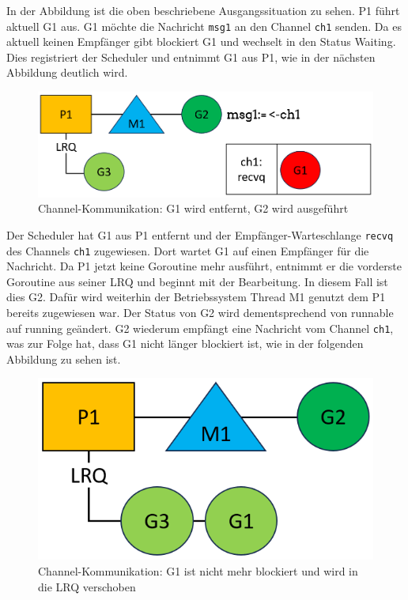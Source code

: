 \documentclass[fontsize=12pt,paper=a4,twoside=semi,parskip=half-,headsepline,headinclude]{scrreprt}
\begin{document}
In der Abbildung ist die oben beschriebene Ausgangssituation zu sehen. P1 führt aktuell G1 aus. G1 möchte die Nachricht \texttt{msg1} an den Channel \texttt{ch1} senden. Da es aktuell keinen Empfänger gibt blockiert G1 und wechselt in den Status Waiting. Dies registriert der Scheduler und entnimmt G1 aus P1, wie in der nächsten Abbildung deutlich wird.

\begin{figure}[h]
	\centering
	\includegraphics[scale=0.5]{figures/GoroutineChannel2.png}
	\caption{Channel-Kommunikation: G1 wird entfernt, G2 wird ausgeführt}
	\label{fig:GoroutineChannel2}
\end{figure}

Der Scheduler hat G1 aus P1 entfernt und der Empfänger-Warteschlange \texttt{recvq} des Channels \texttt{ch1} zugewiesen. Dort wartet G1 auf einen Empfänger für die Nachricht. Da P1 jetzt keine Goroutine mehr ausführt, entnimmt er die vorderste Goroutine aus seiner LRQ und beginnt mit der Bearbeitung. In diesem Fall ist dies G2. Dafür wird weiterhin der Betriebssystem Thread M1 genutzt dem P1 bereits zugewiesen war. Der Status von G2 wird dementsprechend von runnable auf running geändert. G2 wiederum empfängt eine Nachricht vom Channel \texttt{ch1}, was zur Folge hat, dass G1 nicht länger blockiert ist, wie in der folgenden Abbildung zu sehen ist.

\begin{figure}[h]
	\centering
	\includegraphics[scale=0.5]{figures/GoroutineChannel3.png}
	\caption{Channel-Kommunikation: G1 ist nicht mehr blockiert und wird in die LRQ verschoben}
	\label{fig:GoroutineChannel3}
\end{figure}
\end{document}
